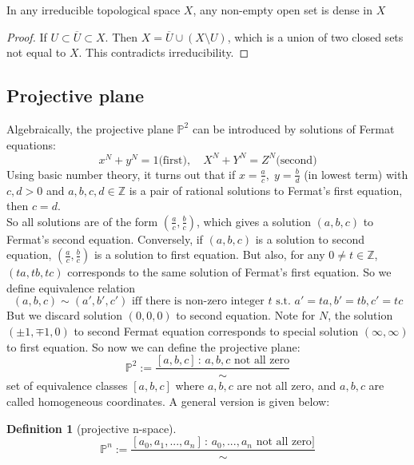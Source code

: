 \documentclass[12pt]{article}
\theoremstyle{remark}
\theoremstyle{definition}
\newtheorem{definition}{Definition}[subsection]
\newcommand{\Z}[0]{\mathbb{Z}}
\newcommand{\Pc}{\mathbb{P}}   %
\begin{document}
{        \begin{prop}
            In any irreducible topological space $X$, any non-empty open set is dense in $X$
        \end{prop}
        \begin{proof}
            If $U \subset \overline{U} \subset X$. Then $X = \overline{U} \cup (X \setminus U)$, which is a union of two closed sets not equal to $X$. This contradicts irreducibility. 
        \end{proof}
            
        \subsection{Projective plane}
        Algebraically, the projective plane $\Pc^2$ can be introduced by solutions of Fermat equations:
        $$x^N + y^N = 1\text{(first)}, \quad X^N + Y^N = Z^N \text{(second)}$$
        Using basic number theory, it turns out that if $x = \frac{a}{c}, \; y = \frac{b}{d}$ (in lowest      term) with $c, d > 0$ and $a, b, c, d \in \Z$ is a pair of rational solutions to Fermat's first      equation, then $c = d$. \\
        So all solutions are of the form $(\frac{a}{c}, \frac{b}{c})$, which gives a solution $(a, b,      c)$ to Fermat's second equation. Conversely, if $(a, b, c)$ is a solution to second equation,       $(\frac{a}{c}, \frac{b}{c})$ is a solution to first equation. But also, for any $0 \neq t \in       \Z$, $(ta, tb, tc)$ corresponds to the same solution of Fermat's first equation. So we define      equivalence relation 
        $$(a, b, c) \sim (a', b', c') \text{ iff there is non-zero integer } t \text{ s.t. } a' = ta, b'      = tb, c' = tc$$ 
        But we discard solution $(0, 0, 0)$ to second equation. Note for $N$, the solution $(\pm 1, \mp         1, 0)$ to second Fermat equation corresponds to special solution $(\infty, \infty)$ to first        equation. So now we can define the projective plane: 
        $$\Pc^2 := \frac{[a, b, c] \, : \, a, b, c \text{ not all zero}}{\sim}$$
        set of equivalence classes $[a, b, c]$ where $a, b, c$ are not all zero, and $a, b, c$ are      called homogeneous coordinates. A general version is given below: 
        
        \begin{definition}[projective n-space]
            $$\Pc^n := \frac{[a_0, a_1, ..., a_n] \, : \, a_0, ..., a_n \text{ not all zero}]}{\sim}$$
        \end{definition}
        
}
\end{document}
